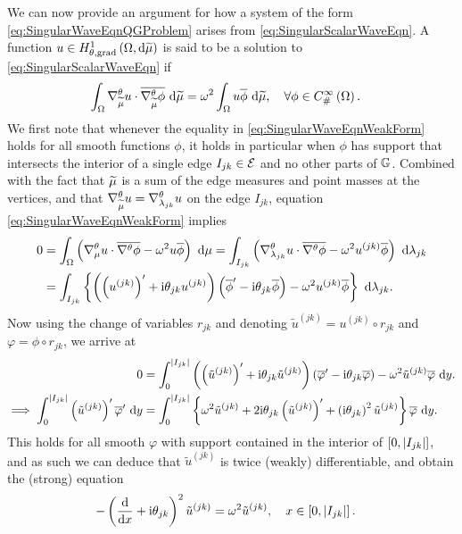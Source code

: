 We can now provide an argument for how a system of the form \eqref{eq:SingularWaveEqnQGProblem} arises from \eqref{eq:SingularScalarWaveEqn}.
A function $u\in H^1_{\theta, \mathrm{grad}}\left( \Omega, \mathrm{d}\widetilde{\mu} \right)$ is said to be a solution to \eqref{eq:SingularScalarWaveEqn} if
\begin{align} \label{eq:SingularWaveEqnWeakForm}
	\int_{\Omega}\nabla^{\theta}_{\widetilde{\mu}}u\cdot\overline{\nabla^{\theta}_{\widetilde{\mu}}\phi} \ \mathrm{d}\widetilde{\mu} &= \omega^2\int_{\Omega}u\overline{\phi} \ \mathrm{d}\widetilde{\mu}, \quad\forall \phi\in C^{\infty}_{\#}\left( \Omega \right).
\end{align}
We first note that whenever the equality in \eqref{eq:SingularWaveEqnWeakForm} holds for all smooth functions $\phi$, it holds in particular when $\phi$ has support that intersects the interior of a single edge $I_{jk}\in\mathcal{E}$ and no other parts of $\mathbb{G}$.
Combined with the fact that $\widetilde{\mu}$ is a sum of the edge measures and point masses at the vertices, and that $\nabla^{\theta}_{\widetilde{\mu}}u=\nabla^{\theta}_{\lambda_{jk}}u$ on the edge $I_{jk}$, equation \eqref{eq:SingularWaveEqnWeakForm} implies
\begin{align*}
	0 &= \int_{\Omega} \left( \nabla^{\theta}_\mu u \cdot \overline{\nabla^{\theta}\phi} - \omega^2 u\overline{\phi} \right)  \ \mathrm{d}\mu
	= \int_{I_{jk}} \left( \nabla^{\theta}_{\lambda_{jk}}u \cdot \overline{\nabla^{\theta}\phi} - \omega^2 u^{(jk)}\overline{\phi} \right)  \ \mathrm{d}\lambda_{jk} \\
	&= \int_{I_{jk}} \left\{  \left( \left( u^{(jk)} \right)' + \mathrm{i}\theta_{jk} u^{(jk)} \right)\left( \overline{\phi}' - \mathrm{i}\theta_{jk} \overline{\phi}  \right) - \omega^2 u^{(jk)}\overline{\phi}  \right\}  \ \mathrm{d}\lambda_{jk}.
\end{align*}
Now using the change of variables $r_{jk}$ and denoting $\tilde{u}^{(jk)} = u^{(jk)} \circ r_{jk}$ and $\varphi = \phi\circ r_{jk}$, we arrive at
\begin{align*}
	0 &= \int_{0}^{\left\lvert I_{jk} \right\rvert} \left( \left( \tilde{u}^{(jk)} \right)' + \mathrm{i}\theta_{jk} \tilde{u}^{(jk)} \right)\left( \overline{\varphi}' - \mathrm{i}\theta_{jk} \overline{\varphi}  \right) - \omega^2 \tilde{u}^{(jk)}\overline{\varphi} \ \mathrm{d} y. \\
	\implies
	\int_{0}^{\left\lvert I_{jk} \right\rvert} \left( \tilde{u}^{(jk)} \right)'\overline{\varphi}' \ \mathrm{d} y &=
	\int_{0}^{\left\lvert I_{jk} \right\rvert} \left\{  \omega^2\tilde{u}^{(jk)} + 2\mathrm{i}\theta_{jk}\left( \tilde{u}^{(jk)} \right)' + \left( \mathrm{i}\theta_{jk} \right)^2\tilde{u}^{(jk)}  \right\} \overline{\varphi} \ \mathrm{d} y.
\end{align*}
This holds for all smooth $\varphi$ with support contained in the interior of $\left[ 0,\left\lvert I_{jk} \right\rvert \right]$, and as such we can deduce that $\tilde{u}^{(jk)}$ is twice (weakly) differentiable, and obtain the (strong) equation
\begin{align*}
	-\left( \dfrac{\mathrm{d}}{\mathrm{d}x} + \mathrm{i}\theta_{jk} \right)^2 \tilde{u}^{(jk)} &= \omega^2 \tilde{u}^{(jk)}, \quad x\in\left[ 0,\left\lvert I_{jk} \right\rvert \right].
\end{align*}

